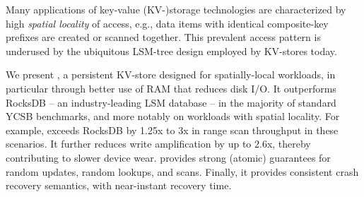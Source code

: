 Many applications of key-value (KV-)storage technologies are characterized by high \emph{spatial locality}
of access, e.g., data items with identical composite-key prefixes are created or scanned together.  
This prevalent access pattern is underused by the ubiquitous LSM-tree design employed by KV-stores today.

We present \sys, a persistent KV-store designed for spatially-local workloads, in particular through better use of RAM
that reduces disk I/O.  It outperforms RocksDB -- an industry-leading LSM database -- in the majority 
of standard YCSB benchmarks, and more notably on workloads with spatial locality. For example, \sys\/ 
exceeds RocksDB by 1.25x to 3x in range scan throughput in these scenarios. It further reduces write amplification 
by up to 2.6x, thereby contributing to slower device wear. \sys\/ provides strong (atomic) guarantees for random updates, random lookups, and scans. Finally, it provides consistent crash recovery semantics, with near-instant recovery time. 